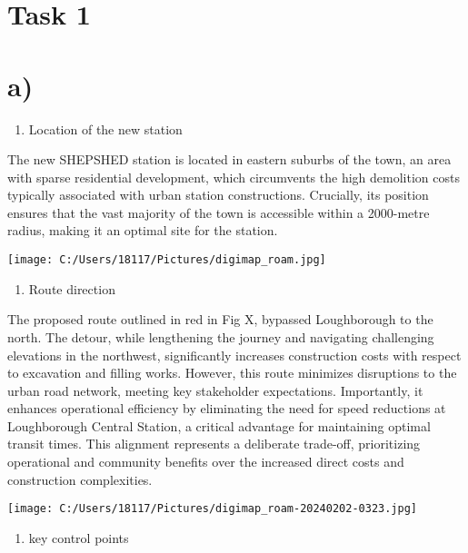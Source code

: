\documentclass[
]{article}
\author{}
\date{}
\begin{document}
\section{Task 1}\label{task-1}

\section{a)}\label{a}

\begin{enumerate}
\def\labelenumi{\arabic{enumi}.}
\item
  Location of the new station
\end{enumerate}

The new SHEPSHED station is located in eastern suburbs of the town, an
area with sparse residential development, which circumvents the high
demolition costs typically associated with urban station constructions.
Crucially, its position ensures that the vast majority of the town is
accessible within a 2000-metre radius, making it an optimal site for the
station.

\texttt{[image: C:/Users/18117/Pictures/digimap\_roam.jpg]}

\begin{enumerate}
\def\labelenumi{\arabic{enumi}.}
\item
  Route direction
\end{enumerate}

The proposed route outlined in red in Fig X, bypassed Loughborough to
the north. The detour, while lengthening the journey and navigating
challenging elevations in the northwest, significantly increases
construction costs with respect to excavation and filling works.
However, this route minimizes disruptions to the urban road network,
meeting key stakeholder expectations. Importantly, it enhances
operational efficiency by eliminating the need for speed reductions at
Loughborough Central Station, a critical advantage for maintaining
optimal transit times. This alignment represents a deliberate trade-off,
prioritizing operational and community benefits over the increased
direct costs and construction complexities.

\texttt{[image: C:/Users/18117/Pictures/digimap\_roam-20240202-0323.jpg]}

\begin{enumerate}
\def\labelenumi{\arabic{enumi}.}
\item
  key control points
\end{enumerate}
\end{document}
